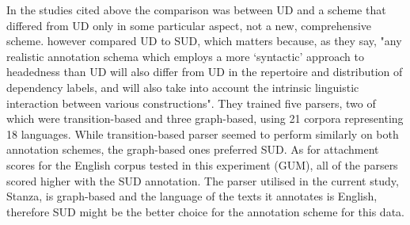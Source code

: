 In the studies cited above the comparison was between UD and a scheme that differed from UD only in some particular aspect, not a new, comprehensive scheme. \cite{tuo:prz:lac:21} however compared UD to SUD, which matters because, as they say, "any realistic annotation schema which employs a more ‘syntactic’ approach to headedness than UD will also differ from UD in the repertoire and distribution of dependency labels, and will also take into account the intrinsic linguistic interaction between various constructions". They trained five parsers, two of which were transition-based and three graph-based, using 21 corpora representing 18 languages. While transition-based parser seemed to perform similarly on both annotation schemes, the graph-based ones preferred SUD. As for attachment scores for the English corpus tested in this experiment (GUM), all of the parsers scored higher with the SUD annotation. The parser utilised in the current study, Stanza, is graph-based and the language of the texts it annotates is English, therefore SUD might be the better choice for the annotation scheme for this data. 

